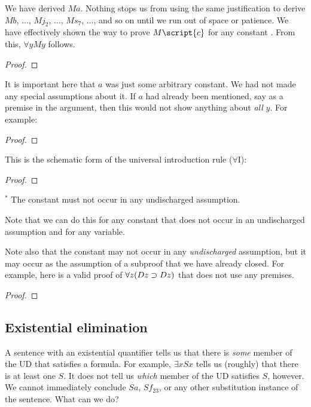 We have derived $Ma$. Nothing stops us from using the same justification to derive $Mb$, $\ldots$, $Mj_2$, $\ldots$, $Ms_7$, $\ldots$, and so on until we run out of space or patience. We have effectively shown the way to prove $M\script{c}$ for any constant . From this, $\forall y My$ follows.

\begin{proof}
	 
	 
\end{proof}

It is important here that $a$ was just some arbitrary constant. We had not made any special assumptions about it. If $a$ had already been mentioned, say as a premise in the argument, then this would not show anything about \emph{all} $y$. For example:

\begin{proof}
	 
	 
\end{proof}


This is the schematic form of the universal introduction rule ($\forall$I):

\begin{proof}
	 
\end{proof}
$^\ast$ The constant  must not occur in any undischarged assumption.

Note that we can do this for any constant that does not occur in an undischarged assumption and for any variable.

Note also that the constant may not occur in any \emph{undischarged} assumption, but it may occur as the assumption of a subproof that we have already closed. For example, here is a valid proof of $\forall z(Dz \supset Dz)$ that does not use any premises.

\begin{proof}
	\open
	\close
\end{proof}


\subsection{Existential elimination}
A sentence with an existential quantifier tells us that there is \emph{some} member of the UD that satisfies a formula. For example, $\exists x Sx$ tells us (roughly) that there is at least one $S$. It does not tell us \emph{which} member of the UD satisfies $S$, however. We cannot immediately conclude $Sa$, $Sf_{23}$, or any other substitution instance of the sentence. What can we do?

